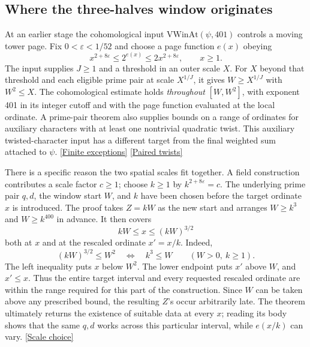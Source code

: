 \documentclass[12pt,letterpaper]{article}
\begin{document}
\subsection{Where the three-halves window originates}
At an earlier stage the cohomological input \(\mathrm{VWinAt}(\psi,401)\) controls a moving tower page. Fix \(0<\varepsilon<1/52\) and choose a page function \(e(x)\) obeying
\[
       x^{2+8\varepsilon}\le 2^{e(x)}\le 2x^{2+8\varepsilon},
       \qquad x\ge1.
\]
The input supplies \(J\ge1\) and a threshold in an outer scale \(X\). For \(X\) beyond that threshold and each eligible prime pair at scale \(X^{1/J}\), it gives \(W\ge X^{1/J}\) with \(W^2\le X\). The cohomological estimate holds \emph{throughout} \([W,W^2]\), with exponent 401 in its integer cutoff and with the page function evaluated at the local ordinate. A prime-pair theorem also supplies bounds on a range of ordinates for auxiliary characters with at least one nontrivial quadratic twist. This auxiliary twisted-character input has a different target from the final weighted sum attached to \(\psi\). \href{https://github.com/nousentllc/riemann-hypothesis/blob/40e56bab026552e089d7afcfeff08d2defb9c005/src/Development/AutomorphicArithmetic/CharacterBoxes/ExistsPageN.lean#L27-L49}{\textsf{[Finite exceptions]}} \href{https://github.com/nousentllc/riemann-hypothesis/blob/40e56bab026552e089d7afcfeff08d2defb9c005/src/Development/AutomorphicArithmetic/CharacterBoxes/PairGood.lean#L18-L30}{\textsf{[Paired twists]}}

There is a specific reason the two spatial scales fit together. A field construction contributes a scale factor \(c\ge1\); choose \(k\ge1\) by \(k^{2+8\varepsilon}=c\). The underlying prime pair \(q,d\), the window start \(W\), and \(k\) have been chosen before the target ordinate \(x\) is introduced. The proof takes \(Z=kW\) as the new start and arranges \(W\ge k^3\) and \(W\ge k^{400}\) in advance. It then covers
\[
              kW\le x\le(kW)^{3/2}
\]
both at \(x\) and at the rescaled ordinate \(x'=x/k\). Indeed,
\[
     (kW)^{3/2}\le W^2
          \quad\Longleftrightarrow\quad k^3\le W
          \qquad(W>0,\ k\ge1).
\]
The left inequality puts \(x\) below \(W^2\). The lower endpoint puts \(x'\) above \(W\), and \(x'\le x\). Thus the entire target interval and every requested rescaled ordinate are within the range required for this part of the construction. Since \(W\) can be taken above any prescribed bound, the resulting \(Z\)'s occur arbitrarily late. The theorem ultimately returns the existence of suitable data at every \(x\); reading its body shows that the same \(q,d\) works across this particular interval, while \(e(x/k)\) can vary. \href{https://github.com/nousentllc/riemann-hypothesis/blob/40e56bab026552e089d7afcfeff08d2defb9c005/src/Development/AutomorphicArithmetic/CharacterBoxes/WinPairs.lean#L23-L52}{\textsf{[Scale choice]}}
\end{document}
